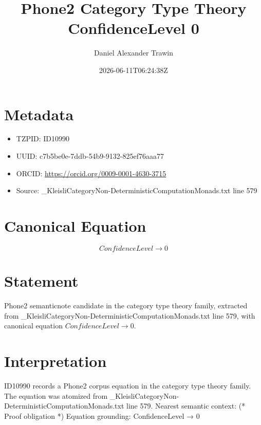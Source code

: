 \documentclass[11pt]{article}
\title{Phone2 Category Type Theory ConfidenceLevel 0}
\author{Daniel Alexander Trawin}
\date{2026-06-11T06:24:38Z}
\begin{document}
\maketitle
\section*{Metadata}
\begin{itemize}
\item TZPID: ID10990
\item UUID: c7b5be0e-7ddb-54b9-9132-825ef76aaa77
\item ORCID: \url{https://orcid.org/0009-0001-4630-3715}
\item Source: _KleisliCategoryNon-DeterministicComputationMonads.txt line 579
\end{itemize}
\section*{Canonical Equation}
\[
ConfidenceLevel → 0
\]
\section*{Statement}
Phone2 semanticnote candidate in the category type theory family, extracted from _KleisliCategoryNon-DeterministicComputationMonads.txt line 579, with canonical equation $ConfidenceLevel → 0$.
\section*{Interpretation}
ID10990 records a Phone2 corpus equation in the category type theory family. The equation was atomized from _KleisliCategoryNon-DeterministicComputationMonads.txt line 579. Nearest semantic context: (* Proof obligation *) Equation grounding: ConfidenceLevel → 0
\end{document}
